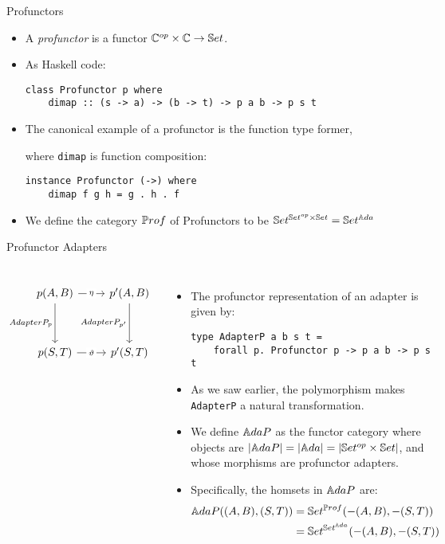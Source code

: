 \begin{frame}[fragile]{Profunctors}
	\begin{itemize}
		\item A \textit{profunctor} is a functor $\mathbb{C}^{op} \times \mathbb{C} \to \mathbb{S}et$.
		\pause\item As Haskell code:
		\begin{lstlisting}
class Profunctor p where
	dimap :: (s -> a) -> (b -> t) -> p a b -> p s t
		\end{lstlisting}
		\pause\item The canonical example of a profunctor is the function type former, 
		
		where \texttt{dimap} is function composition:
		\begin{lstlisting}
instance Profunctor (->) where
	dimap f g h = g . h . f
		\end{lstlisting}
		\pause\item We define the category ${\mathbb{P}rof}$ of Profunctors to be $\mathbb{S}et^{\mathbb{S}et^{op} \times \mathbb{S}et} = \mathbb{S}et^{\mathbb{A}da}$
	\end{itemize}
\end{frame}
\begin{frame}[fragile]{Profunctor Adapters}
	\begin{columns}
			\[\begin{tikzcd}
				{p(A,B)} & {p'(A,B)} \\
				\\
				{p(S,T)} & {p'(S,T)}
				\arrow["\eta"{description}, from=1-1, to=1-2]
				\arrow["{AdapterP_p}"', from=1-1, to=3-1]
				\arrow["{AdapterP_{p'}}"', from=1-2, to=3-2]
				\arrow["\vartheta"{description}, from=3-1, to=3-2]
			\end{tikzcd}\]
		\begin{itemize}
			\item The profunctor representation of an adapter is given by:
			\begin{lstlisting}
type AdapterP a b s t =
	forall p. Profunctor p -> p a b -> p s t
			\end{lstlisting}
			\pause\item As we saw earlier, the polymorphism makes \texttt{AdapterP} a natural transformation.
			\pause\item We define $\mathbb{A}daP$ as the functor category where objects are $|\mathbb{A}daP| = |{\mathbb{A}da}| = |\mathbb{S}et^{op} \times \mathbb{S}et|$, and whose morphisms are profunctor adapters.
			\pause\item Specifically, the homsets in $\mathbb{A}daP$ are:
			\begin{align*}
				\mathbb{A}daP ((A,B),(S,T)) &= \mathbb{S}et^{\mathbb{P}rof}(-(A, B), -(S, T))\\
									 &= \mathbb{S}et^{\mathbb{S}et^{{\mathbb{A}da}}}(-(A, B), -(S, T))\\
			\end{align*}
		\end{itemize}
	\end{columns}
\end{frame}
